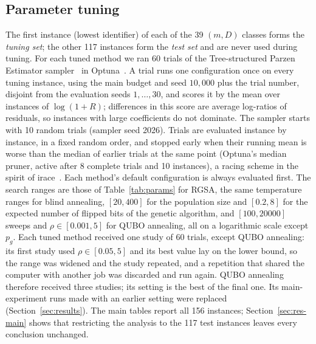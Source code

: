 \documentclass[pdflatex,sn-mathphys-num]{sn-jnl}
\theoremstyle{thmstyleone}
\theoremstyle{thmstylethree}
\begin{document}
\subsection{Parameter tuning}\label{sec:tuning}
The first instance (lowest identifier) of each of the 39 $(m,D)$ classes forms the \emph{tuning set}; the other 117 instances form the \emph{test set} and are never used during tuning. For each tuned method we ran 60 trials of the Tree-structured Parzen Estimator sampler~\cite{bergstra2011} in Optuna~\cite{akiba2019}. A trial runs one configuration once on every tuning instance, using the main budget and seed $10{,}000$ plus the trial number, disjoint from the evaluation seeds $1,\dots,30$, and scores it by the mean over instances of $\log(1+R)$; differences in this score are average log-ratios of residuals, so instances with large coefficients do not dominate. The sampler starts with 10 random trials (sampler seed 2026). Trials are evaluated instance by instance, in a fixed random order, and stopped early when their running mean is worse than the median of earlier trials at the same point (Optuna's median pruner, active after 8 complete trials and 10 instances), a racing scheme in the spirit of irace~\cite{lopezibanez2016}. Each method's default configuration is always evaluated first. The search ranges are those of Table~\ref{tab:params} for RGSA, the same temperature ranges for blind annealing, $[20,400]$ for the population size and $[0.2,8]$ for the expected number of flipped bits of the genetic algorithm, and $[100,20000]$ sweeps and $\rho\in[0.001,5]$ for QUBO annealing, all on a logarithmic scale except $p_g$. Each tuned method received one study of 60 trials, except QUBO annealing: its first study used $\rho\in[0.05,5]$ and its best value lay on the lower bound, so the range was widened and the study repeated, and a repetition that shared the computer with another job was discarded and run again. QUBO annealing therefore received three studies; its setting is the best of the final one. Its main-experiment runs made with an earlier setting were replaced (Section~\ref{sec:results}). The main tables report all 156 instances; Section~\ref{sec:res-main} shows that restricting the analysis to the 117 test instances leaves every conclusion unchanged.
\end{document}
